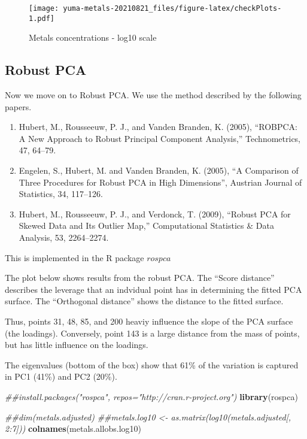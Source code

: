 \documentclass[]{article}
\newenvironment{Shaded}{\begin{snugshade}}{\end{snugshade}}
\newcommand{\CommentTok}[1]{\textcolor[rgb]{0.56,0.35,0.01}{\textit{#1}}}
\newcommand{\KeywordTok}[1]{\textcolor[rgb]{0.13,0.29,0.53}{\textbf{#1}}}
\newcommand{\NormalTok}[1]{#1}
\begin{document}
\begin{figure}
\centering
\texttt{[image: yuma-metals-20210821\_files/figure-latex/checkPlots-1.pdf]}
\caption{Metals concentrations - log10 scale}
\end{figure}

\hypertarget{robust-pca}{%
\subsection{Robust PCA}\label{robust-pca}}

Now we move on to Robust PCA. We use the method described by the
following papers.

\begin{enumerate}
\def\labelenumi{\arabic{enumi}.}
\item
  Hubert, M., Rousseeuw, P. J., and Vanden Branden, K. (2005), ``ROBPCA:
  A New Approach to Robust Principal Component Analysis,''
  Technometrics, 47, 64--79.
\item
  Engelen, S., Hubert, M. and Vanden Branden, K. (2005), ``A Comparison
  of Three Procedures for Robust PCA in High Dimensions'', Austrian
  Journal of Statistics, 34, 117--126.
\item
  Hubert, M., Rousseeuw, P. J., and Verdonck, T. (2009), ``Robust PCA
  for Skewed Data and Its Outlier Map,'' Computational Statistics \&
  Data Analysis, 53, 2264--2274.
\end{enumerate}

This is implemented in the R package \(rospca\)

The plot below shows results from the robust PCA. The ``Score distance''
describes the leverage that an indvidual point has in determining the
fitted PCA surface. The ``Orthogonal distance'' shows the distance to
the fitted surface.

Thus, points 31, 48, 85, and 200 heaviy influence the slope of the PCA
surface (the loadings). Conversely, point 143 is a large distance from
the mass of points, but has little influence on the loadings.

The eigenvalues (bottom of the box) show that 61\% of the variation is
captured in PC1 (41\%) and PC2 (20\%).

\begin{Shaded}
\begin{Highlighting}[]
\CommentTok{##install.packages("rospca", repos="http://cran.r-project.org")}
\KeywordTok{library}\NormalTok{(rospca)}

\CommentTok{##dim(metals.adjusted)}
\CommentTok{##metals.log10 <- as.matrix(log10(metals.adjusted[, 2:7]))}
\KeywordTok{colnames}\NormalTok{(metals.allobs.log10)}
\end{Highlighting}
\end{Shaded}
\end{document}
